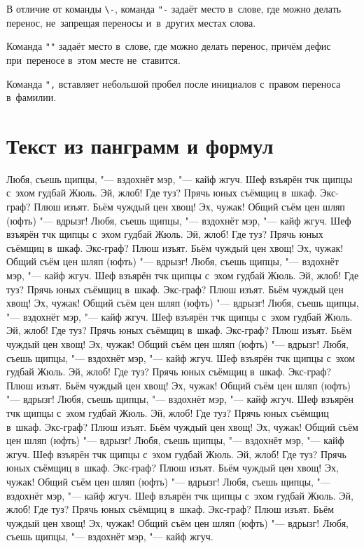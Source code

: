 В отличие от команды \verb|\-|, команда \verb|"-| задаёт место в~слове, где
можно делать перенос, не~запрещая переносы и~в~других местах слова.

Команда \verb|""| задаёт место в~слове, где можно делать перенос, причём дефис
при~переносе в~этом месте не~ставится.

Команда \verb|",| вставляет небольшой пробел после инициалов с~правом переноса
в~фамилии.

\section{Текст из панграмм и формул}

Любя, съешь щипцы, "--- вздохнёт мэр, "--- кайф жгуч. Шеф взъярён тчк щипцы
с~эхом гудбай Жюль. Эй, жлоб! Где туз? Прячь юных съёмщиц в~шкаф. Экс-граф?
Плюш изъят. Бьём чуждый цен хвощ! Эх, чужак! Общий съём цен шляп (юфть) "---
вдрызг! Любя, съешь щипцы, "--- вздохнёт мэр, "--- кайф жгуч. Шеф взъярён тчк
щипцы с~эхом гудбай Жюль. Эй, жлоб! Где туз? Прячь юных съёмщиц в~шкаф.
Экс-граф? Плюш изъят. Бьём чуждый цен хвощ! Эх, чужак! Общий съём цен шляп
(юфть) "--- вдрызг! Любя, съешь щипцы, "--- вздохнёт мэр, "--- кайф жгуч. Шеф
взъярён тчк щипцы с~эхом гудбай Жюль. Эй, жлоб! Где туз? Прячь юных съёмщиц
в~шкаф. Экс-граф? Плюш изъят. Бьём чуждый цен хвощ! Эх, чужак! Общий съём цен
шляп (юфть) "--- вдрызг! Любя, съешь щипцы, "--- вздохнёт мэр, "--- кайф жгуч.
Шеф взъярён тчк щипцы с~эхом гудбай Жюль. Эй, жлоб! Где туз? Прячь юных съёмщиц
в~шкаф. Экс-граф? Плюш изъят. Бьём чуждый цен хвощ! Эх, чужак! Общий съём цен
шляп (юфть) "--- вдрызг! Любя, съешь щипцы, "--- вздохнёт мэр, "--- кайф жгуч.
Шеф взъярён тчк щипцы с~эхом гудбай Жюль. Эй, жлоб! Где туз? Прячь юных съёмщиц
в~шкаф. Экс-граф? Плюш изъят. Бьём чуждый цен хвощ! Эх, чужак! Общий съём цен
шляп (юфть) "--- вдрызг! Любя, съешь щипцы, "--- вздохнёт мэр, "--- кайф жгуч.
Шеф взъярён тчк щипцы с~эхом гудбай Жюль. Эй, жлоб! Где туз? Прячь юных съёмщиц
в~шкаф. Экс-граф? Плюш изъят. Бьём чуждый цен хвощ! Эх, чужак! Общий съём цен
шляп (юфть) "--- вдрызг! Любя, съешь щипцы, "--- вздохнёт мэр, "--- кайф жгуч.
Шеф взъярён тчк щипцы с~эхом гудбай Жюль. Эй, жлоб! Где туз? Прячь юных съёмщиц
в~шкаф. Экс-граф? Плюш изъят. Бьём чуждый цен хвощ! Эх, чужак! Общий съём цен
шляп (юфть) "--- вдрызг! Любя, съешь щипцы, "--- вздохнёт мэр, "--- кайф жгуч.
Шеф взъярён тчк щипцы с~эхом гудбай Жюль. Эй, жлоб! Где туз? Прячь юных съёмщиц
в~шкаф. Экс-граф? Плюш изъят. Бьём чуждый цен хвощ! Эх, чужак! Общий съём цен
шляп (юфть) "--- вдрызг! Любя, съешь щипцы, "--- вздохнёт мэр, "--- кайф жгуч.
